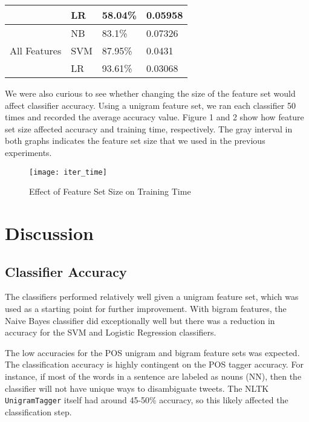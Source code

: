 \documentclass[twocolumn]{article}
\begin{document}
\begin{table}[h]
\begin{tabular}{|c|l|l|l|}
                              & LR                                       & 58.04\%                                & 0.05958                           \\ \hline
\multirow{3}{*}{All Features} & NB                                       & 83.1\%                                 & 0.07326                           \\ \cline{2-4}
                              & SVM                                      & 87.95\%                                & 0.0431                            \\ \cline{2-4}
                              & LR                                       & 93.61\%                                & 0.03068                           \\ \hline
\end{tabular}
\end{table}

We were also curious to see whether changing the size of the feature set would affect classifier accuracy. Using a unigram feature set, we ran each classifier 50 times and recorded the average accuracy value. Figure 1 and 2 show how feature set size affected accuracy and training time, respectively. The gray interval in both graphs indicates the feature set size that we used in the previous experiments.

\begin{figure}
    \centering
    \texttt{[image: iter\_time]}
    \caption{Effect of Feature Set Size on Training Time}
\end{figure}

\section{Discussion}

\subsection{Classifier Accuracy}

The classifiers performed relatively well given a unigram feature set, which was used as a starting point for further improvement. With bigram features, the Naive Bayes classifier did exceptionally well but there was a reduction in accuracy for the SVM and Logistic Regression classifiers.

The low accuracies for the POS unigram and bigram feature sets was expected. The classification accuracy is highly contingent on the POS tagger accuracy. For instance, if most of the words in a sentence are labeled as nouns (NN), then the classifier will not have unique ways to disambiguate tweets. The NLTK \texttt{UnigramTagger} itself had around 45-50\% accuracy, so this likely affected the classification step.
\end{document}
